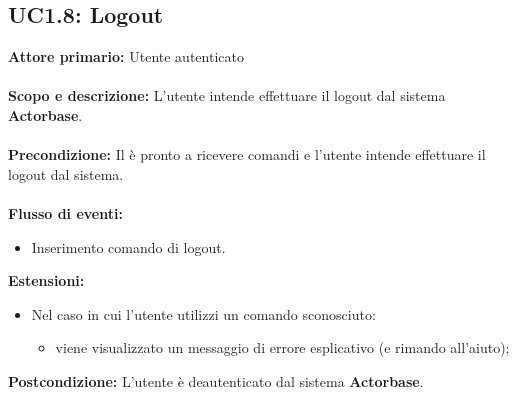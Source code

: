 \documentclass{scalatekids-article}
\begin{document}
\subsection{UC1.8: Logout}
\textbf{Attore primario:} Utente autenticato\\ \\
\textbf{Scopo e descrizione:} L'utente intende effettuare il logout dal sistema \textbf{Actorbase}.\\ \\
\textbf{Precondizione:} Il  è pronto a ricevere comandi e l'utente intende effettuare il logout dal sistema.\\ \\
\textbf{Flusso di eventi:}
\begin{itemize}
\item Inserimento comando di logout.
\end{itemize}
\textbf{Estensioni:}
\begin{itemize}
\item Nel caso in cui l'utente utilizzi un comando sconosciuto:
  \begin{itemize}
  \item viene visualizzato un messaggio di errore esplicativo (e rimando all'aiuto);
  \end{itemize}
\end{itemize}
\textbf{Postcondizione:} L'utente è deautenticato dal sistema \textbf{Actorbase}.
\end{document}
